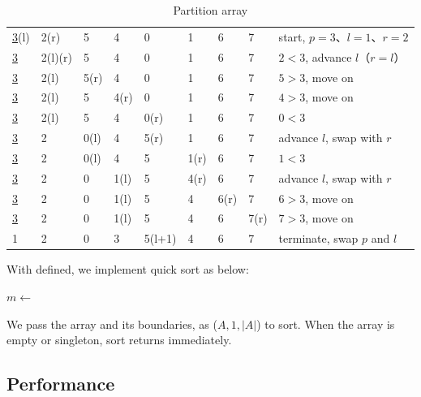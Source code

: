 \documentclass[b5paper]{article}
\begin{document}
\begin{table}[htbp]
\centering
\begin{tabular}{|llllllll|l|}
\hline
\underline{3}(l)  & 2(r) & 5 & 4 & 0 & 1 & 6 & 7 & start, $p = 3$、$l = 1$、$r = 2$ \\
\underline{3} & 2(l)(r) & 5 & 4 & 0 & 1 & 6 & 7 & $2 < 3$, advance $l$（$r=l$）\\
\underline{3} & 2(l) & 5(r) & 4 & 0 & 1 & 6 & 7 & $5 > 3$, move on \\
\underline{3} & 2(l) & 5 & 4(r) & 0 & 1 & 6 & 7 & $4 > 3$, move on \\
\underline{3} & 2(l) & 5 & 4 & 0(r) & 1 & 6 & 7 & $0 < 3$ \\
\underline{3} & 2 & 0(l) & 4 & 5(r) & 1 & 6 & 7 & advance $l$, swap with $r$ \\
\underline{3} & 2 & 0(l) & 4 & 5 & 1(r) & 6 & 7 & $1 < 3$ \\
\underline{3} & 2 & 0 & 1(l) & 5 & 4(r) & 6 & 7 & advance $l$, swap with $r$ \\
\underline{3} & 2 & 0 & 1(l) & 5 & 4 & 6(r) & 7 & $6 > 3$, move on \\
\underline{3} & 2 & 0 & 1(l) & 5 & 4 & 6 & 7(r) & $7 > 3$, move on \\
1 & 2 & 0 & 3 & 5(l+1) & 4 & 6 & 7 & terminate, swap $p$ and $l$ \\
\hline
\end{tabular}
\caption{Partition array} \label{tab:partition-steps}
\end{table}

With  defined, we implement quick sort as below:

\begin{algorithmic}[1]
    \State $m \gets$ 
    \State {}
    \State {}
  \EndIf
\EndProcedure
\end{algorithmic}

We pass the array and its boundaries, as ($A, 1, |A|$) to sort. When the array is empty or singleton, sort returns immediately.

\begin{Exercise}
\end{Exercise}

\subsection{Performance}
\end{document}
